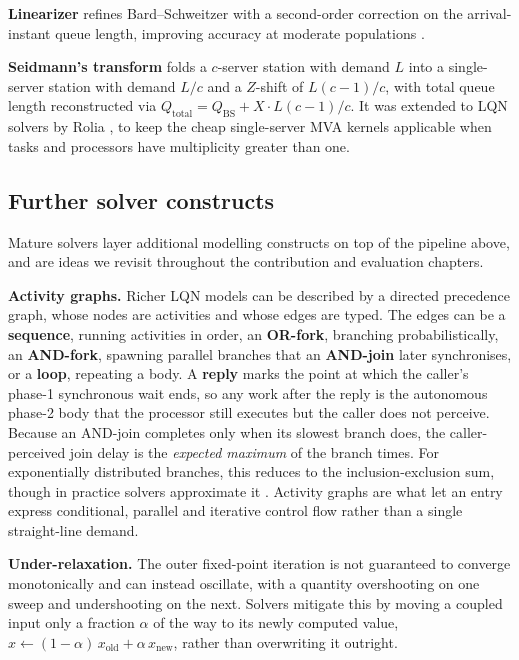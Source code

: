 \textbf{Linearizer} \cite{chandy82} refines Bard–Schweitzer with a second-order correction on the arrival-instant queue length, improving accuracy at moderate populations \cite{zahorjan88}.

\textbf{Seidmann's transform} \cite{seidmann87} folds a $c$-server station with demand $L$ into a single-server station with demand $L/c$ and a $Z$-shift of $L(c-1)/c$, with total queue length reconstructed via $Q_{\text{total}} = Q_{\text{BS}} + X \cdot L(c-1)/c$. It was extended to LQN solvers by Rolia \cite{rolia92}, to keep the cheap single-server MVA kernels applicable when tasks and processors have multiplicity greater than one.

\subsection{Further solver constructs}
\label{sec:lqn-other-machinery}

Mature solvers layer additional modelling constructs on top of the pipeline above, and are ideas we revisit throughout the contribution and evaluation chapters.

\textbf{Activity graphs.} Richer LQN models can be described by a directed precedence graph, whose nodes are activities and whose edges are typed. The edges can be a \textbf{sequence}, running activities in order, an \textbf{OR-fork}, branching probabilistically, an \textbf{AND-fork}, spawning parallel branches that an \textbf{AND-join} later synchronises, or a \textbf{loop}, repeating a body. A \textbf{reply} marks the point at which the caller's phase-1 synchronous wait ends, so any work after the reply is the autonomous phase-2 body that the processor still executes but the caller does not perceive. Because an AND-join completes only when its slowest branch does, the caller-perceived join delay is the \textit{expected maximum} of the branch times. For exponentially distributed branches, this reduces to the inclusion-exclusion sum, though in practice solvers approximate it \cite{franks99}. Activity graphs are what let an entry express conditional, parallel and iterative control flow rather than a single straight-line demand.

\textbf{Under-relaxation.} The outer fixed-point iteration is not guaranteed to converge monotonically and can instead oscillate, with a quantity overshooting on one sweep and undershooting on the next. Solvers mitigate this by moving a coupled input only a fraction $\alpha$ of the way to its newly computed value, $x \leftarrow (1-\alpha)\,x_{\text{old}} + \alpha\,x_{\text{new}}$, rather than overwriting it outright.

